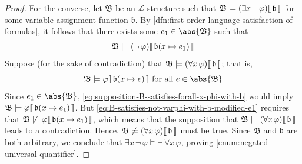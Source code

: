 \begin{proof}
    \vspace{0.3cm}
    \noindent
    For the converse, let \( \mathfrak{B} \) be an \( \mathcal{L} \)-structure such that
    \( \folwffsatisfaction{\mathfrak{B}}{\mleft( \exists x \, \lnot \, \varphi \mright)}{\mathfrak{b}} \) for some variable assignment function \( \mathfrak{b} \).
    By \cref{dfn:first-order-language-satisfaction-of-formulas}, it follows that there exists some \( e_{1} \in \abs{\mathfrak{B}} \) such that
    \begin{equation}
        \label{eq:B-satisfies-not-varphi-with-b-modified-e1}
        \folwffsatisfaction{\mathfrak{B}}{\mleft( \lnot \, \varphi \mright)}{ \folmodifiedvariableassignmentfunction{\mathfrak{b}}{x}{e_{1}} }
    \end{equation}
    Suppose (for the sake of contradiction) that \( \folwffsatisfaction{\mathfrak{B}}{\mleft( \forall x \, \varphi \mright)}{\mathfrak{b}} \); that is,
    \begin{equation}
        \label{eq:supposition-B-satisfies-forall-x-phi-with-b}
        \folwffsatisfaction{\mathfrak{B}}{\varphi}{ \folmodifiedvariableassignmentfunction{\mathfrak{b}}{x}{e} } \ \text{for all} \ e \in \abs{\mathfrak{B}}
    \end{equation}
    Since \( e_{1} \in \abs{\mathfrak{B}} \), \eqref{eq:supposition-B-satisfies-forall-x-phi-with-b} would imply
    \( \folwffsatisfaction{\mathfrak{B}}{\varphi}{ \folmodifiedvariableassignmentfunction{\mathfrak{b}}{x}{e_{1}} } \).
    But \eqref{eq:B-satisfies-not-varphi-with-b-modified-e1} requires that
    \( \folwffnonsatisfaction{\mathfrak{B}}{\varphi}{ \folmodifiedvariableassignmentfunction{\mathfrak{b}}{x}{e_{1}} } \), which means that
    the supposition that \( \folwffsatisfaction{\mathfrak{B}}{\mleft( \forall x \, \varphi \mright)}{\mathfrak{b}} \) leads to a contradiction.
    Hence, \( \folwffnonsatisfaction{\mathfrak{B}}{\mleft( \forall x \, \varphi \mright)}{\mathfrak{b}} \) must be true.
    Since \( \mathfrak{B} \) and \( \mathfrak{b} \) are both arbitrary, we conclude that \( \exists x \, \lnot \, \varphi \models \lnot \, \forall x \, \varphi \),
    proving \ref{enum:negated-universal-quantifier}.


\end{proof}
